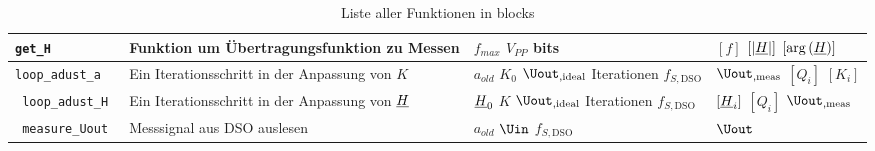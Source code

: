 \documentclass[../Report.tex]{subfiles}
\begin{document}
\begin{table}[H]
\begin{tabular}[t]{| >{\texttt\bgroup}m{3.5cm}<{\egroup}|m{8cm}|m{2cm}|m{2cm}|}
  \hline
  get\_H & Funktion um Übertragungsfunktion zu Messen & $f_{max}$ \newline $V_{PP}$ \newline bits & $[f]$ \newline $[|\underline{H}|]$ \newline $[\arg{(\underline{H})}]$\\
  \hline
  loop\_adust\_a & Ein Iterationsschritt in der Anpassung von $K$ & $a_{old}$ \newline $K_0$ \newline $\Uout_{,\textrm{ideal}}$ \newline Iterationen \newline $f_{S,\textrm{DSO}}$ & $\Uout_{,\textrm{meas}}$ \newline$[Q_i]$ \newline $[K_i]$\\
  \hline
  loop\_adust\_H & Ein Iterationsschritt in der Anpassung von $\underline{H}$ & $\underline{H}_0$ \newline $K$ \newline $\Uout_{,\textrm{ideal}}$ \newline Iterationen \newline $f_{S,\textrm{DSO}}$ & $[\underline{H}_i]$ \newline $[Q_i]$ \newline $\Uout_{,\textrm{meas}}$\\
  \hline
  measure\_Uout & Messsignal aus DSO auslesen & $a_{old}$ \newline $\Uin$ \newline $f_{S,\textrm{DSO}}$ & $\Uout$\\
  \hline
\end{tabular}
\caption{Liste aller Funktionen in blocks}
\label{tab:anhang.Funktionen.blocks}
\end{table}
\end{document}

